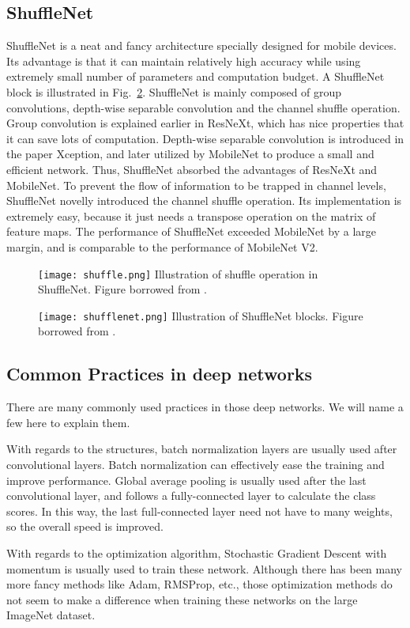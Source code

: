 \subsection{ShuffleNet}
ShuffleNet is a neat and fancy architecture specially designed for mobile devices. Its advantage is that it can maintain relatively high accuracy while using extremely small number of parameters and computation budget. A ShuffleNet block is illustrated in Fig.~\ref{fig:shufflenet}. ShuffleNet is mainly composed of group convolutions, depth-wise separable convolution and the channel shuffle operation. Group convolution is explained earlier in ResNeXt, which has nice properties that it can save lots of computation. Depth-wise separable convolution is introduced in the paper Xception, and later utilized by MobileNet\cite{howard2017mobilenets} to produce a small and efficient network. Thus, ShuffleNet absorbed the advantages of ResNeXt and MobileNet. To prevent the flow of information to be trapped in channel levels, ShuffleNet novelly introduced the channel shuffle operation. Its implementation is extremely easy, because it just needs a transpose operation on the matrix of feature maps. The performance of ShuffleNet exceeded MobileNet by a large margin, and is comparable to the performance of MobileNet V2.
\begin{figure}[!htp]
	\centering
	\texttt{[image: shuffle.png]}
	{Illustration of shuffle operation in ShuffleNet. Figure borrowed from \parencite{zhang2017shufflenet}.}
	\label{fig:shuffle}
\end{figure}
\begin{figure}[!htp]
	\centering
	\texttt{[image: shufflenet.png]}
	{Illustration of ShuffleNet blocks. Figure borrowed from \parencite{zhang2017shufflenet}.}
	\label{fig:shufflenet}
\end{figure}

\subsection{Common Practices in deep networks}

There are many commonly used practices in those deep networks. We will name a few here to explain them.

With regards to the structures, batch normalization layers are usually used after convolutional layers. Batch normalization can effectively ease the training and improve performance. Global average pooling is usually used after the last convolutional layer, and follows a fully-connected layer to calculate the class scores. In this way, the last full-connected layer need not have to many weights, so the overall speed is improved.

With regards to the optimization algorithm, Stochastic Gradient Descent with momentum is usually used to train these network. Although there has been many more fancy methods like Adam, RMSProp, etc., those optimization methods do not seem to make a difference when training these networks on the large ImageNet dataset.